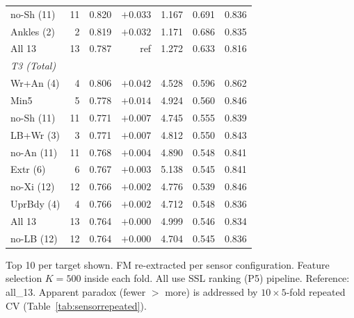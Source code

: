 \documentclass[11pt,a4paper]{article}
\newcommand{\tabnote}[1]{\par\vspace{2pt}\noindent\begin{minipage}{\linewidth}\small\itshape\raggedright #1\par\end{minipage}\par\vspace{0.4em}}
\begin{document}
\begin{table}[H]
{\begin{tabular}{lrrrrrr}
no-Sh (11)    & 11 & 0.820 & $+0.033$ & 1.167 & 0.691 & 0.836 \\
Ankles (2)    &  2 & 0.819 & $+0.032$ & 1.171 & 0.686 & 0.835 \\
All 13        & 13 & 0.787 & ref      & 1.272 & 0.633 & 0.816 \\
\midrule
\multicolumn{7}{l}{\emph{T3 (Total)}} \\
Wr+An (4)     &  4 & 0.806 & $+0.042$ & 4.528 & 0.596 & 0.862 \\
Min5          &  5 & 0.778 & $+0.014$ & 4.924 & 0.560 & 0.846 \\
no-Sh (11)    & 11 & 0.771 & $+0.007$ & 4.745 & 0.555 & 0.839 \\
LB+Wr (3)     &  3 & 0.771 & $+0.007$ & 4.812 & 0.550 & 0.843 \\
no-An (11)    & 11 & 0.768 & $+0.004$ & 4.890 & 0.548 & 0.841 \\
Extr (6)      &  6 & 0.767 & $+0.003$ & 5.138 & 0.545 & 0.841 \\
no-Xi (12)    & 12 & 0.766 & $+0.002$ & 4.776 & 0.539 & 0.846 \\
UprBdy (4)    &  4 & 0.766 & $+0.002$ & 4.712 & 0.548 & 0.836 \\
All 13        & 13 & 0.764 & $+0.000$ & 4.999 & 0.546 & 0.834 \\
no-LB (12)    & 12 & 0.764 & $+0.000$ & 4.704 & 0.545 & 0.836 \\
\bottomrule
\end{tabular}
}%
\tabnote{Top 10 per target shown. FM re-extracted per sensor configuration. Feature selection $K=500$ inside each fold. All use SSL ranking (P5) pipeline. Reference: all\_13. Apparent paradox (fewer $>$ more) is addressed by $10\times 5$-fold repeated CV (Table~\ref{tab:sensorrepeated}).}
\end{table}

\begin{table}[H]
\centering
\caption{Sensor span: mean CCC across $10\times 5$-fold repeated CV ($N=94$ PD).}
\label{tab:sensorrepeated}

\end{table}
\end{document}
